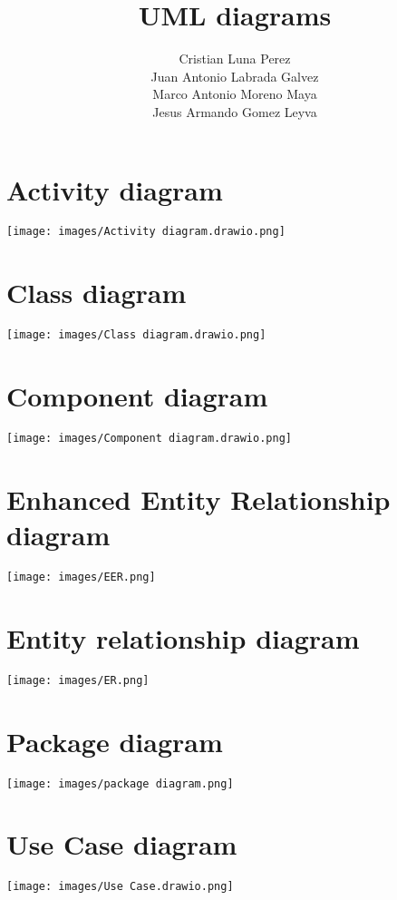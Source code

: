 \documentclass[12pt]{article}
\begin{document}
\title{UML diagrams}
\author{
    Cristian Luna Perez \\
    Juan Antonio Labrada Galvez \\
    Marco Antonio Moreno Maya \\
    Jesus Armando Gomez Leyva
}

\maketitle

\section{Activity diagram}
\texttt{[image: images/Activity diagram.drawio.png]}

\section{Class diagram}
\texttt{[image: images/Class diagram.drawio.png]}

\section{Component diagram}
\texttt{[image: images/Component diagram.drawio.png]}

\section{Enhanced Entity Relationship diagram}
\texttt{[image: images/EER.png]}

\section{Entity relationship diagram}
\texttt{[image: images/ER.png]}

\section{Package diagram}
\texttt{[image: images/package diagram.png]}

\section{Use Case diagram}
\texttt{[image: images/Use Case.drawio.png]}
\end{document}
